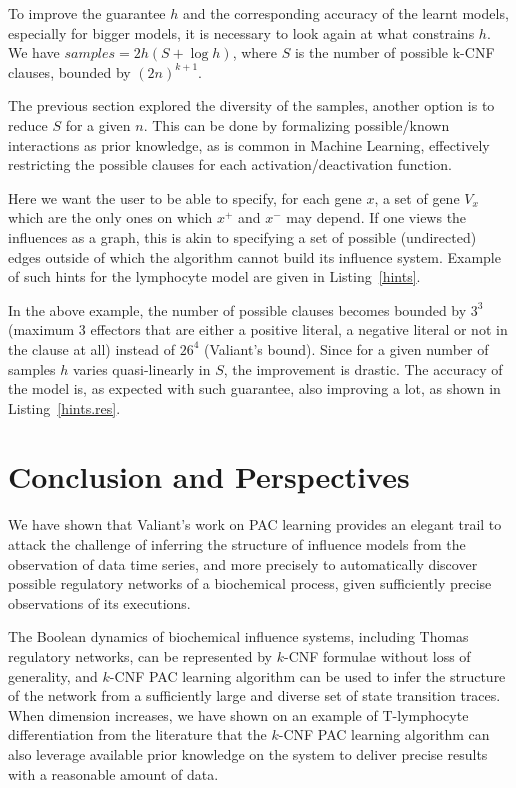 \documentclass{llncs}
\begin{document}
To improve the guarantee $h$ and the corresponding accuracy of the learnt
models, especially for bigger models, it is necessary to look again at what
constrains $h$. We have \(samples = 2h(S + \log h)\), where $S$ is the number
of possible k-CNF clauses, bounded by $(2n)^{k+1}$.

The previous section explored the diversity of the samples, another option is
to reduce $S$ for a given $n$. This can be done by formalizing possible/known
interactions as prior knowledge, as is common in Machine Learning, effectively
restricting the possible clauses for each activation/deactivation function.

Here we want the user to be able to specify, for each gene $x$, a set of gene $V_x$ which are the only ones on which $x^+$ and $x^-$ may depend. If one views the influences as a graph, this is akin to specifying a set of possible (undirected) edges outside of which the algorithm cannot build its influence system. Example of such hints for the lymphocyte model are given in Listing~\ref{hints}. 

In the above example, the number of possible clauses becomes bounded by $3^3$
(maximum 3 effectors that are either a positive literal, a negative literal or
not in the clause at all) instead of $26^4$ (Valiant's bound). Since for a
given number of samples $h$ varies quasi-linearly in $S$, the improvement is
drastic. The accuracy of the model is, as expected with such guarantee, also
improving a lot, as shown in Listing~\ref{hints.res}.

\section{Conclusion and Perspectives}

We have shown that Valiant's work on PAC learning provides an elegant trail 
to attack the challenge of inferring the structure of influence models from the observation of data time series,
and more precisely to automatically discover possible regulatory networks of a biochemical process, given sufficiently precise observations of its executions.

The Boolean dynamics of biochemical influence systems, including Thomas regulatory networks, can be represented by $k$-CNF formulae without loss of generality,
and $k$-CNF PAC learning algorithm can be used to infer the structure of the network from
a sufficiently large and diverse set of state transition traces.
When dimension increases, we have shown on an example of T-lymphocyte differentiation from the literature
that the $k$-CNF PAC learning algorithm can also leverage available
prior knowledge on the system to deliver precise results with a reasonable
amount of data.
\end{document}
